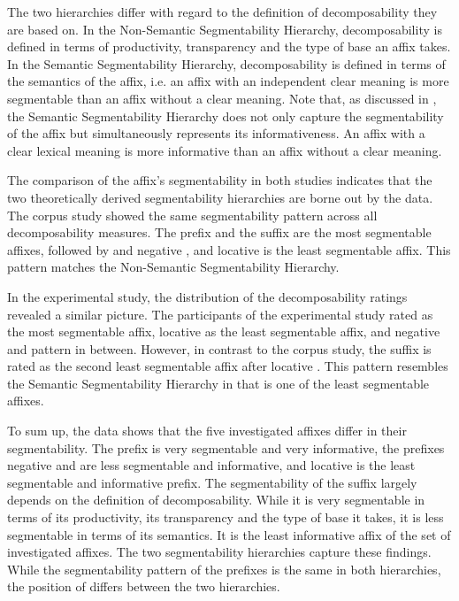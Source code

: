 The two hierarchies differ with regard to the definition of decomposability they are based on. %
In the Non-Semantic Segmentability Hierarchy, decomposability is defined in terms of productivity, transparency and the type of base an affix takes. In the Semantic Segmentability Hierarchy, decomposability is defined in terms of the semantics of the affix, i.e. an affix with an independent clear meaning is more segmentable than an affix without a clear meaning. Note that, as discussed in , the Semantic Segmentability Hierarchy does not only capture the segmentability of the affix but simultaneously represents its informativeness. An affix with a clear lexical meaning is more informative than an affix without a clear meaning.


The comparison of the affix's segmentability in both studies indicates that the two theoretically derived segmentability hierarchies are borne out by the data.
 The corpus study showed the same segmentability pattern across all decomposability measures.
 The prefix  and the suffix  are the most segmentable affixes, followed by  and negative , and locative  is the least segmentable affix. This pattern matches the Non-Semantic Segmentability Hierarchy.


In the experimental study, the distribution of the decomposability ratings revealed a similar picture. The participants of the experimental study rated  as the most segmentable affix, locative  as the least segmentable affix, and negative  and  pattern in between. However, in contrast to the corpus study, the suffix  is rated as the second least segmentable affix after locative . This pattern resembles the Semantic Segmentability Hierarchy in that  is one of the least segmentable affixes.

To sum up, the data shows that the five investigated affixes differ in their segmentability. The prefix  is very segmentable and very informative, the prefixes negative  and  are less segmentable and informative, and locative  is the least segmentable and informative prefix. The segmentability of the suffix  largely depends on the definition of decomposability. While it is very segmentable in terms of its productivity, its transparency and the type of base it takes, it is less segmentable in terms of its semantics. It is the least informative affix of the set of investigated affixes.
The two segmentability hierarchies capture these findings. While the segmentability pattern of the prefixes is the same in both hierarchies, the position of  differs between the two hierarchies. 


